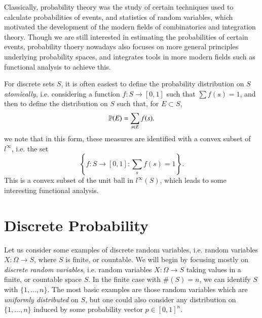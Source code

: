 Classically, probability theory was the study of certain techniques used to calculate probabilities of events, and statistics of random variables, which motivated the development of the modern fields of combinatorics and integration theory. Though we are still interested in estimating the probabilities of certain events, probability thoery nowadays also focuses on more general principles underlying probability spaces, and integrates tools in more modern fields such as functional analysis to achieve this.

\begin{example}
    For discrete sets $S$, it is often easiest to define the probability distribution on $S$ \emph{atomically}, i.e. considering a function $f: S \to [0,1]$ such that $\sum f(s) = 1$, and then to define the distribution on $S$ such that, for $E \subset S$,
    \[ \operatorname{\mathbb{P}}(E) = \sum_{s \in E} f(s). \]
    we note that in this form, these measures are identified with a convex subset of $l^\infty$, i.e. the set
    \[ \left\{ f: S \to [0,1]: \sum_s f(s) = 1 \right\}. \]
    This is a convex subset of the unit ball in $l^\infty(S)$, which leads to some interesting functional analysis.
\end{example}

\section{Discrete Probability}

Let us consider some examples of discrete random variables, i.e. random variables $X: \Omega \to S$, where $S$ is finite, or countable. We will begin by focusing mostly on \emph{discrete random variables}, i.e. random variables $X: \Omega \to S$ taking values in a finite, or countable space $S$. In the finite case with $\#(S) = n$, we can identify $S$ with $\{ 1, \dots, n \}$. The most basic examples are those random variables which are \emph{uniformly distributed} on $S$, but one could also consider any distribution on $\{ 1, \dots, n \}$ induced by some probability vector $p \in [0,1]^n$.

